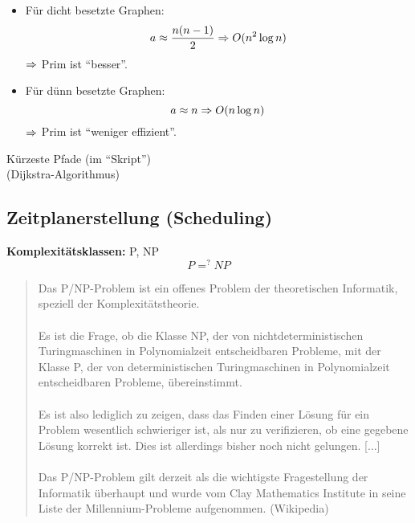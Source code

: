 \documentclass[a4paper,twoside,DIV15,BCOR12mm]{scrbook}
\begin{document}


\begin{itemize}
	\item Für dicht besetzte Graphen:
	$$a \approx \frac{n(n-1)}{2} \Rightarrow O(n^2 \log n)$$
	$\Rightarrow$ Prim ist "`besser"'.
	\item Für dünn besetzte Graphen:
	$$a \approx n \Rightarrow O(n \log n) $$
	$\Rightarrow$ Prim ist "`weniger effizient"'.
\end{itemize}
Kürzeste Pfade (im "`Skript"') \\
(Dijkstra-Algorithmus)

\subsection{Zeitplanerstellung (Scheduling)}
\textbf{Komplexitätsklassen:} P, NP
$$P =^? NP$$
\begin{quotation}
Das P/NP-Problem ist ein offenes Problem der theoretischen Informatik, speziell der Komplexitätstheorie. \\
\\
Es ist die Frage, ob die Klasse NP, der von nichtdeterministischen Turingmaschinen in Polynomialzeit entscheidbaren Probleme, mit der Klasse P, der von deterministischen Turingmaschinen in Polynomialzeit entscheidbaren Probleme, übereinstimmt. \\
\\
Es ist also lediglich zu zeigen, dass das Finden einer Lösung für ein Problem wesentlich schwieriger ist, als nur zu verifizieren, ob eine gegebene Lösung korrekt ist. Dies ist allerdings bisher noch nicht gelungen. [...] \\
\\
Das P/NP-Problem gilt derzeit als die wichtigste Fragestellung der Informatik überhaupt und wurde vom Clay Mathematics Institute in seine Liste der Millennium-Probleme aufgenommen. (Wikipedia)
\end{quotation}
\end{document}
